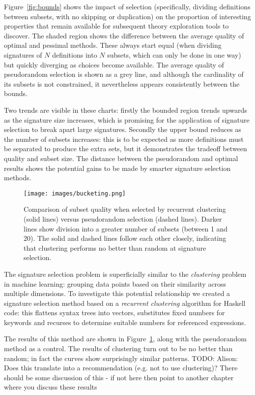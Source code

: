 Figure~\ref{fig:bounds} shows the impact of selection (specifically, dividing
definitions between subsets, with no skipping or duplication) on the proportion
of interesting properties that remain available for subsequent theory
exploration tools to discover. The shaded region shows the difference between
the average quality of optimal and pessimal methods. These always start equal
(when dividing signatures of $N$ definitions into $N$ subsets, which can only be
done in one way) but quickly diverging as choices become available. The average
quality of pseudorandom selection is shown as a grey line, and although the
cardinality of its subsets is not constrained, it nevertheless appears
consistently between the bounds.

Two trends are visible in these charts: firstly the bounded region trends
upwards as the signature size increases, which is promising for the application
of signature selection to break apart large signatures. Secondly the upper bound
reduces as the number of subsets increases: this is to be expected as more
definitions must be separated to produce the extra sets, but it demonstrates the
tradeoff between quality and subset size. The distance between the pseudorandom
and optimal results shows the potential gains to be made by smarter signature
selection methods.

\begin{figure}
  \texttt{[image: images/bucketing.png]}
  \caption{Comparison of subset quality when selected by recurrent clustering
    (solid lines) versus pseudorandom selection (dashed lines). Darker lines
    show division into a greater number of subsets (between 1 and 20). The solid
    and dashed lines follow each other closely, indicating that clustering
    performs no better than random at signature selection.}
  \label{fig:bucketing}
\end{figure}

The signature selection problem is superficially similar to the
\emph{clustering} problem in machine learning: grouping data points based on
their similarity across multiple dimensions. To investigate this potential
relationship we created a signature selection method based on a \emph{recurrent
  clustering} algorithm for Haskell code: this flattens syntax trees into
vectors, substitutes fixed numbers for keywords and recurses to determine
suitable numbers for referenced expressions.

The results of this method are shown in Figure~\ref{fig:bucketing}, along with
the pseudorandom method as a control. The results of clustering turn out to be
no better than random; in fact the curves show surprisingly similar patterns.
\iffalse
TODO: Alison: Does this translate into a recommendation (e.g. not to
use clustering)? There should be some discussion of this - if not here then
point to another chapter where you discuss these results

